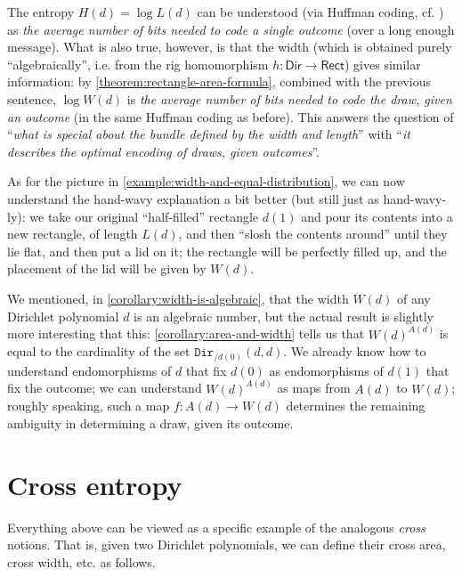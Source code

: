 \documentclass[11pt,fleqn]{article}
\newcommand{\cat}[1]{\mathtt{#1}}
\newcommand{\rig}[1]{\mathsf{#1}}
\newcommand{\Dir}{\rig{Dir}}
\newcommand{\cDir}{\cat{Dir}}
\newcommand{\Rect}{\rig{Rect}}
\begin{document}
\begin{remark}
  The entropy $H(d)=\log L(d)$ can be understood (via Huffman coding, cf. \cite{H1952}) as \emph{the average number of bits needed to code a single outcome} (over a long enough message).
  What is also true, however, is that the width (which is obtained purely ``algebraically'', i.e. from the rig homomorphism $h\colon\Dir\to\Rect$) gives similar information: by \cref{theorem:rectangle-area-formula}, combined with the previous sentence, $\log W(d)$ is \emph{the average number of bits needed to code the draw, given an outcome} (in the same Huffman coding as before).
  This answers the question of ``\emph{what is special about the bundle defined by the width and length}'' with ``\emph{it describes the optimal encoding of draws, given outcomes}''.

  As for the picture in \cref{example:width-and-equal-distribution}, we can now understand the hand-wavy explanation a bit better (but still just as hand-wavy-ly):
  we take our original ``half-filled'' rectangle $d(1)$ and pour its contents into a new rectangle, of length $L(d)$, and then ``slosh the contents around'' until they lie flat, and then put a lid on it;
  the rectangle will be perfectly filled up, and the placement of the lid will be given by $W(d)$.
\end{remark}

\begin{remark}
  We mentioned, in \cref{corollary:width-is-algebraic}, that the width $W(d)$ of any Dirichlet polynomial $d$ is an algebraic number, but the actual result is slightly more interesting that this:
  \cref{corollary:area-and-width} tells us that $W(d)^{A(d)}$ is equal to the cardinality of the set $\cDir_{/d(0)}(d,d)$.
  We already know how to understand endomorphisms of $d$ that fix $d(0)$ as endomorphisms of $d(1)$ that fix the outcome;
  we can understand $W(d)^{A(d)}$ as maps from $A(d)$ to $W(d)$;
  roughly speaking, such a map $f\colon A(d)\to W(d)$ determines the remaining ambiguity in determining a draw, given its outcome.
\end{remark}



\section{Cross entropy}
\label{section:cross-entropy}

Everything above can be viewed as a specific example of the analogous \emph{cross} notions.
That is, given two Dirichlet polynomials, we can define their cross area, cross width, etc. as follows.
\end{document}
